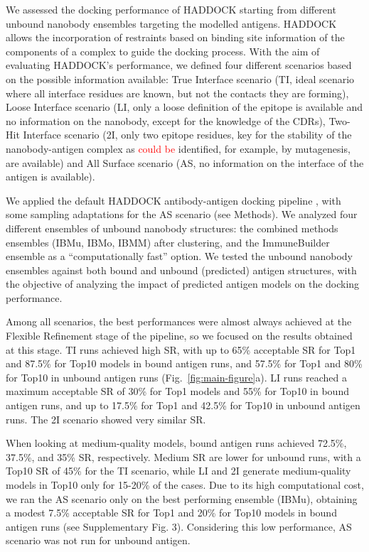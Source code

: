 \documentclass[12pt]{article}
\begin{document}
We assessed the docking performance of HADDOCK starting from different unbound nanobody ensembles targeting the modelled antigens. HADDOCK allows the incorporation of restraints based on binding site information of the components of a complex to guide the docking process. With the aim of evaluating HADDOCK's performance, we defined four different scenarios based on the possible information available: True Interface scenario (TI, ideal scenario where all interface residues are known, but not the contacts they are forming), Loose Interface scenario (LI, only a loose definition of the epitope is available and no information on the nanobody, except for the knowledge of the CDRs), Two-Hit Interface scenario (2I, only two epitope residues, key for the stability of the nanobody-antigen complex as \textcolor{Red}{could be} identified, for example, by mutagenesis, are available) and All Surface scenario (AS, no information on the interface of the antigen is available).

We applied the default HADDOCK antibody-antigen docking pipeline \cite{ambrosetti2020modeling}, with some sampling adaptations for the AS scenario (see Methods). We analyzed four different ensembles of unbound nanobody structures: the combined methods ensembles (IBMu, IBMo, IBMM) after clustering, and the ImmuneBuilder ensemble as a “computationally fast” option. We tested the unbound nanobody ensembles against both bound and unbound (predicted) antigen structures, with the objective of analyzing the impact of predicted antigen models on the docking performance.

Among all scenarios, the best performances were almost always achieved at the Flexible Refinement stage of the pipeline, so we focused on the results obtained at this stage. TI runs achieved high SR, with up to 65\% acceptable SR for Top1 and 87.5\% for Top10 models in bound antigen runs, and 57.5\% for Top1 and 80\% for Top10 in unbound antigen runs (Fig.~\ref{fig:main-figure}a). LI runs reached a maximum acceptable SR of 30\% for Top1 models and 55\% for Top10 in bound antigen runs, and up to 17.5\% for Top1 and 42.5\% for Top10 in unbound antigen runs. The 2I scenario showed very similar SR.

When looking at medium-quality models, bound antigen runs achieved 72.5\%, 37.5\%, and 35\% SR, respectively. Medium SR are lower for unbound runs, with a Top10 SR of 45\% for the TI scenario, while LI and 2I generate medium-quality models in Top10 only for 15-20\% of the cases. Due to its high computational cost, we ran the AS scenario only on the best performing ensemble (IBMu), obtaining a modest 7.5\% acceptable SR for Top1 and 20\% for Top10 models in bound antigen runs (see Supplementary Fig. 3). Considering this low performance, AS scenario was not run for unbound antigen.
\end{document}
